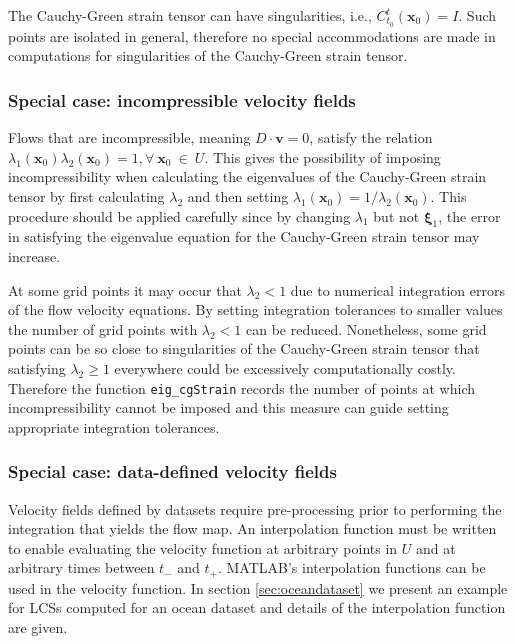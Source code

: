\documentclass{article}
\begin{document}
The Cauchy-Green strain tensor can have singularities, i.e., $C_{t_0}^t(\boldsymbol x_0) = I$. Such points are isolated in general\parencite{delmarcelle94}, therefore no special accommodations are made in computations for singularities of the Cauchy-Green strain tensor.

\subsubsection{Special case: incompressible velocity fields}

Flows that are incompressible, meaning $D \cdot \boldsymbol v = 0$, satisfy the relation $\lambda_1(\boldsymbol x_0) \lambda_2(\boldsymbol x_0) = 1, \forall \: \boldsymbol x_0 \: \in \: U$\parencite{arnold78:_mathem}. This gives the possibility of imposing incompressibility when calculating the eigenvalues of the Cauchy-Green strain tensor by first calculating $\lambda_2$ and then setting $\lambda_1(\boldsymbol x_0) = 1/\lambda_2(\boldsymbol x_0)$. This procedure should be applied carefully since by changing $\lambda_1$ but not $\boldsymbol \xi_1$, the error in satisfying the eigenvalue equation for the Cauchy-Green strain tensor may increase.

At some grid points it may occur that $\lambda_2 < 1$ due to numerical integration errors of the flow velocity equations. By setting integration tolerances to smaller values the number of grid points with $\lambda_2 < 1$ can be reduced. Nonetheless, some grid points can be so close to singularities of the Cauchy-Green strain tensor that satisfying $\lambda_2 \geq 1$ everywhere could be excessively computationally costly. Therefore the function \lstinline!eig_cgStrain! records the number of points at which incompressibility cannot be imposed and this measure can guide setting appropriate integration tolerances.

\subsubsection{Special case: data-defined velocity fields}

Velocity fields defined by datasets require pre-processing prior to performing the integration that yields the flow map. An interpolation function must be written to enable evaluating the velocity function at arbitrary points in $U$ and at arbitrary times between $t_-$ and $t_+$. MATLAB's interpolation functions can be used in the velocity function. In section \ref{sec:oceandataset} we present an example for LCSs computed for an ocean dataset and details of the interpolation function are given.
\end{document}
